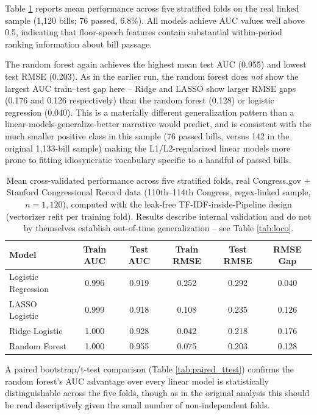 Table \ref{tab:model_performance} reports mean performance across five stratified folds on the real linked sample (1,120 bills; 76 passed, 6.8\%). All models achieve AUC values well above 0.5, indicating that floor-speech features contain substantial within-period ranking information about bill passage.

The random forest again achieves the highest mean test AUC (0.955) and lowest test RMSE (0.203). As in the earlier run, the random forest does \emph{not} show the largest AUC train--test gap here -- Ridge and LASSO show larger RMSE gaps (0.176 and 0.126 respectively) than the random forest (0.128) or logistic regression (0.040). This is a materially different generalization pattern than a linear-models-generalize-better narrative would predict, and is consistent with the much smaller positive class in this sample (76 passed bills, versus 142 in the original 1,133-bill sample) making the L1/L2-regularized linear models more prone to fitting idiosyncratic vocabulary specific to a handful of passed bills.

\begin{table}[htbp]
\centering
\caption{Mean cross-validated performance across five stratified folds, real Congress.gov + Stanford Congressional Record data (110th--114th Congress, regex-linked sample, $n=1{,}120$), computed with the leak-free TF-IDF-inside-Pipeline design (vectorizer refit per training fold). Results describe internal validation and do not by themselves establish out-of-time generalization -- see Table \ref{tab:loco}.}
\label{tab:model_performance}
\vspace{0.5em}

\begin{tabular}{lccccc}
\toprule
\textbf{Model} & \textbf{Train AUC} & \textbf{Test AUC} &
\textbf{Train RMSE} & \textbf{Test RMSE} & \textbf{RMSE Gap} \\
\midrule
Logistic Regression & 0.996 & 0.919 & 0.252 & 0.292 & 0.040 \\
LASSO Logistic      & 0.999 & 0.918 & 0.108 & 0.235 & 0.126 \\
Ridge Logistic      & 1.000 & 0.928 & 0.042 & 0.218 & 0.176 \\
Random Forest       & 1.000 & 0.955 & 0.075 & 0.203 & 0.128 \\
\bottomrule
\end{tabular}
\end{table}

A paired bootstrap/t-test comparison (Table \ref{tab:paired_ttest}) confirms the random forest's AUC advantage over every linear model is statistically distinguishable across the five folds, though as in the original analysis this should be read descriptively given the small number of non-independent folds.

